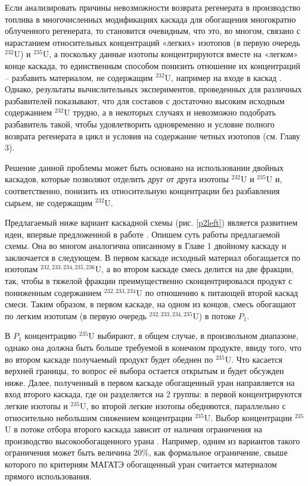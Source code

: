 Если анализировать причины невозможности возврата регенерата в производство топлива в многочисленных модификациях каскада для обогащения многократно облученного регенерата, то становится очевидным, что это, во многом, связано с нарастанием относительных концентраций «легких» изотопов (в первую очередь $^{232}$U) и $^{235}$U, а поскольку данные изотопы концентрируются вместе на «легком» конце каскада, то единственным способом понизить отношение их концентраций – разбавить материалом, не содержащим $^{232}$U, например на входе в каскад \cite{smirnovKaskadnyeShemyZadachah2012}. Однако, результаты вычислительных экспериментов, проведенных для различных разбавителей показывают, что для составов с достаточно высоким исходным содержанием $^{232}$U трудно, а в некоторых случаях и невозможно подобрать разбавитель такой, чтобы удовлетворить одновременно и условие полного возврата регенерата в цикл и условия на содержание четных изотопов (см. Главу 3). 

Решение данной проблемы может быть основано на использовании двойных каскадов, которые позволяют отделить друг от друга изотопы $^{232}$U и $^{235}$U и, соответственно, понизить их относительную концентрации без разбавления сырьем, не содержащим $^{232}$U. 

Предлагаемый ниже вариант каскадной схемы (рис. \ref{p2left}) является развитием идеи, впервые предложенной в работе \cite{vodolazskihSposobIzotopnogoVosstanovleniya2006}. Опишем суть работы предлагаемой схемы. Она во многом аналогична описанному в Главе 1 двойному каскаду и заключается в следующем. В первом каскаде исходный материал обогащается по изотопам $^{232,233,234,235,236}$U, а во втором каскаде смесь делится на две фракции, так, чтобы в тяжелой фракции преимущественно сконцентрировался продукт с пониженным содержанием $^{232,233,234}$U по отношению к питающей второй каскад смеси. Таким образом, в первом каскаде, на одном из концов, смесь обогащают по легким изотопам (в первую очередь $^{232,233,234,235}$U) в потоке $P_1$.

В $P_1$ концентрацию $^{235}$U выбирают, в общем случае, в произвольном диапазоне, однако она должна быть больше требуемой в конечном продукте, ввиду того, что во втором каскаде получаемый продукт будет обеднен по $^{235}$U. Что касается верхней границы, то вопрос её выбора остается открытым и будет обсужден ниже.  Далее, полученный в первом каскаде обогащенный уран направляется на вход второго каскада, где он разделяется на 2 группы: в первой концентрируются легкие изотопы и $^{235}$U, во второй легкие изотопы обедняются, параллельно с относительно небольшим снижением концентрации $^{235}$U. Выбор концентрации $^{235}$U в потоке отбора второго каскада зависит от наличия ограничения на производство высокообогащенного урана \cite{brownOriginsSignificanceLimit2016}. Например, одним из вариантов такого ограничения может быть величина 20\%, как формальное ограничение, свыше которого по критериям МАГАТЭ обогащенный уран считается материалом прямого использования.

